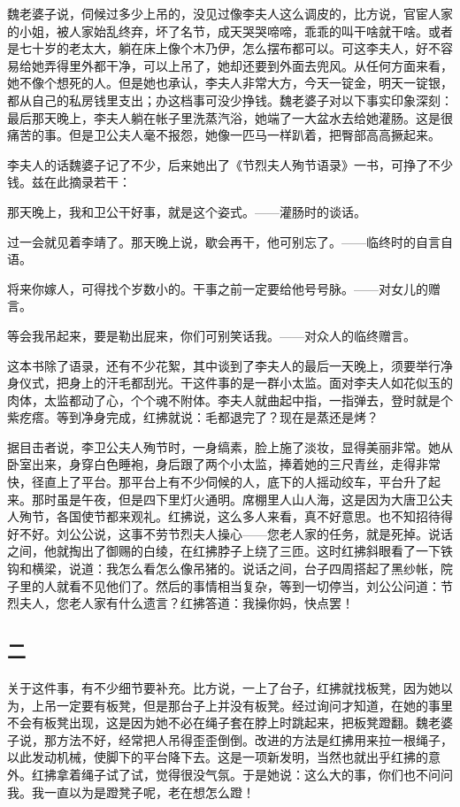 魏老婆子说，伺候过多少上吊的，没见过像李夫人这么调皮的，比方说，官宦人家的小姐，被人家始乱终弃，坏了名节，成天哭哭啼啼，乖乖的叫干啥就干啥。或者是七十岁的老太大，躺在床上像个木乃伊，怎么摆布都可以。可这李夫人，好不容易给她弄得里外都干净，可以上吊了，她却还要到外面去兜风。从任何方面来看，她不像个想死的人。但是她也承认，李夫人非常大方，今天一锭金，明天一锭银，都从自己的私房钱里支出；办这档事可没少挣钱。魏老婆子对以下事实印象深刻：最后那天晚上，李夫人躺在帐子里洗蒸汽浴，她端了一大盆水去给她灌肠。这是很痛苦的事。但是卫公夫人毫不报怨，她像一匹马一样趴着，把臀部高高撅起来。 

李夫人的话魏婆子记了不少，后来她出了《节烈夫人殉节语录》一书，可挣了不少钱。兹在此摘录若干： 

那天晚上，我和卫公干好事，就是这个姿式。——灌肠时的谈话。 

过一会就见着李靖了。那天晚上说，歇会再干，他可别忘了。——临终时的自言自语。 

将来你嫁人，可得找个岁数小的。干事之前一定要给他号号脉。——对女儿的赠言。 

等会我吊起来，要是勒出屁来，你们可别笑话我。——对众人的临终赠言。 

这本书除了语录，还有不少花絮，其中谈到了李夫人的最后一天晚上，须要举行净身仪式，把身上的汗毛都刮光。干这件事的是一群小太监。面对李夫人如花似玉的肉体，太监都动了心，个个魂不附体。李夫人就曲起中指，一指弹去，登时就是个紫疙瘩。等到净身完成，红拂就说：毛都退完了？现在是蒸还是烤？ 

据目击者说，李卫公夫人殉节时，一身缟素，脸上施了淡妆，显得美丽非常。她从卧室出来，身穿白色睡袍，身后跟了两个小太监，捧着她的三尺青丝，走得非常快，径直上了平台。那平台上有不少伺候的人，底下的人摇动绞车，平台升了起来。那时虽是午夜，但是四下里灯火通明。席棚里人山人海，这是因为大唐卫公夫人殉节，各国使节都来观礼。红拂说，这么多人来看，真不好意思。也不知招待得好不好。刘公公说，这事不劳节烈夫人操心——您老人家的任务，就是死掉。说话之间，他就掏出了御赐的白绫，在红拂脖子上绕了三匝。这时红拂斜眼看了一下铁钩和横梁，说道：我怎么看怎么像吊猪的。说话之间，台子四周搭起了黑纱帐，院子里的人就看不见他们了。然后的事情相当复杂，等到一切停当，刘公公问道：节烈夫人，您老人家有什么遗言？红拂答道：我操你妈，快点罢！ 

\subsection{二} 

关于这件事，有不少细节要补充。比方说，一上了台子，红拂就找板凳，因为她以为，上吊一定要有板凳，但是那台子上并没有板凳。经过询问才知道，在她的事里不会有板凳出现，这是因为她不必在绳子套在脖上时跳起来，把板凳蹬翻。魏老婆子说，那方法不好，经常把人吊得歪歪倒倒。改进的方法是红拂用来拉一根绳子，以此发动机械，使脚下的平台降下去。这是一项新发明，当然也就出乎红拂的意外。红拂拿着绳子试了试，觉得很没气氛。于是她说：这么大的事，你们也不问问我。我一直以为是蹬凳子呢，老在想怎么蹬！ 

